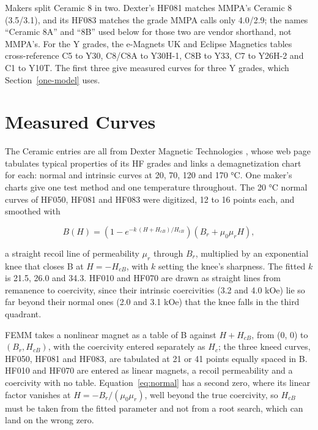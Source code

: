 \documentclass[
  11pt,
]{article}
\begin{document}
Makers split Ceramic 8 in two. Dexter's HF081 matches MMPA's Ceramic 8 (3.5/3.1), and its HF083 matches the grade MMPA calls only 4.0/2.9; the names ``Ceramic 8A'' and ``8B'' used below for those two are vendor shorthand, not MMPA's. For the Y grades, the e-Magnets UK and Eclipse Magnetics tables \cite{emagnets,eclipse} cross-reference C5 to Y30, C8/C8A to Y30H-1, C8B to Y33, C7 to Y26H-2 and C1 to Y10T. The first three give measured curves for three Y grades, which Section~\ref{one-model} uses.

\section{Measured Curves}\label{measured}

The Ceramic entries are all from Dexter Magnetic Technologies \cite{dexter}, whose web page tabulates typical properties of its HF grades and links a demagnetization chart for each: normal and intrinsic curves at 20, 70, 120 and 170 °C. One maker's charts give one test method and one temperature throughout. The 20 °C normal curves of HF050, HF081 and HF083 were digitized, 12 to 16 points each, and smoothed with

\begin{equation}\label{eq:normal}
B(H) = \left(1 - e^{-k\,(H + H_{cB})/H_{cB}}\right)\left(B_r + \mu_0 \mu_r H\right),
\end{equation}

a straight recoil line of permeability \(\mu_r\) through \(B_r\), multiplied by an exponential knee that closes B at \(H = -H_{cB}\), with \(k\) setting the knee's sharpness. The fitted \(k\) is 21.5, 26.0 and 34.3. HF010 and HF070 are drawn as straight lines from remanence to coercivity, since their intrinsic coercivities (3.2 and 4.0 kOe) lie so far beyond their normal ones (2.0 and 3.1 kOe) that the knee falls in the third quadrant.

FEMM takes a nonlinear magnet as a table of B against \(H + H_{cB}\), from (0, 0) to \((B_r, H_{cB})\), with the coercivity entered separately as \(H_c\); the three kneed curves, HF050, HF081 and HF083, are tabulated at 21 or 41 points equally spaced in B. HF010 and HF070 are entered as linear magnets, a recoil permeability and a coercivity with no table. Equation~\eqref{eq:normal} has a second zero, where its linear factor vanishes at \(H = -B_r/(\mu_0\mu_r)\), well beyond the true coercivity, so \(H_{cB}\) must be taken from the fitted parameter and not from a root search, which can land on the wrong zero.
\end{document}
